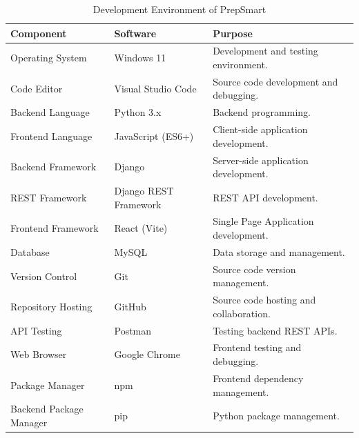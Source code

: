\begin{table}[H]
\centering
\caption{Development Environment of PrepSmart}
\label{tab:development_environment}
\renewcommand{\arraystretch}{1.3}
\begin{tabular}{|p{5cm}|p{4cm}|p{6cm}|}
\hline
\textbf{Component} & \textbf{Software} & \textbf{Purpose} \\
\hline

Operating System & Windows 11 & Development and testing environment. \\
\hline

Code Editor & Visual Studio Code & Source code development and debugging. \\
\hline

Backend Language & Python 3.x & Backend programming. \\
\hline

Frontend Language & JavaScript (ES6+) & Client-side application development. \\
\hline

Backend Framework & Django & Server-side application development. \\
\hline

REST Framework & Django REST Framework & REST API development. \\
\hline

Frontend Framework & React (Vite) & Single Page Application development. \\
\hline

Database & MySQL & Data storage and management. \\
\hline

Version Control & Git & Source code version management. \\
\hline

Repository Hosting & GitHub & Source code hosting and collaboration. \\
\hline

API Testing & Postman & Testing backend REST APIs. \\
\hline

Web Browser & Google Chrome & Frontend testing and debugging. \\
\hline

Package Manager & npm & Frontend dependency management. \\
\hline

Backend Package Manager & pip & Python package management. \\
\hline

\end{tabular}
\end{table}

